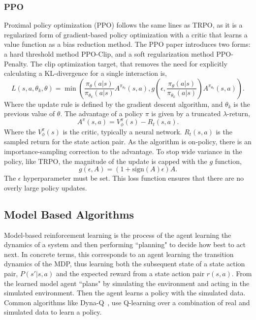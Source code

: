 \subsubsection{PPO}\label{sec:PPO}
Proximal policy optimization (PPO) follows the same lines as TRPO, as it is a regularized form of gradient-based policy optimization with a critic that learns a value function as a bias reduction method. The PPO paper introduces two forms: a hard threshold method PPO-Clip, and a soft regularization method PPO-Penalty. The clip optimization target, that removes the need for explicitly calculating a KL-divergence for a single interaction is,
\begin{equation}
	L(s, a, \theta_k, \theta) = \min \left( \frac{\pi_\theta(a|s)}{\pi_{\theta_k}(a|s)} A^{\pi_{\theta_k}}(s,a), g\left(\epsilon, \frac{\pi_\theta(a|s)}{\pi_{\theta_k}(a|s)} \right)A^{\pi_{\theta_k}}(s, a) \right).
\end{equation}
Where the update rule is defined by the gradient descent algorithm, and $\theta_k$ is the previous value of $\theta$. The advantage of a policy $\pi$ is given by a truncated $\lambda$-return,
\begin{equation}
	A^{\pi}(s, a) = V^\pi _\phi(s) - R_t(s, a).
\end{equation}
Where the $V^\pi _ \phi(s)$ is the critic, typically a neural network. $R_t(s, a)$ is the sampled return for the state action pair. As the algorithm is on-policy, there is an importance-sampling correction to the advantage. To stop wide variance in the policy, like TRPO, the magnitude of the update is capped with the $g$ function,
\begin{equation}
	g(\epsilon, A) = (1 + \text{sign}(A)\epsilon)A.
\end{equation}
The $\epsilon$ hyperparameter must be set. This loss function ensures that there are no overly large policy updates.

\subsection{Model Based Algorithms}
Model-based reinforcement learning is the process of the agent learning the dynamics of a system and then performing ``planning" to decide how best to act next. In concrete terms, this corresponds to an agent learning the transition dynamics of the MDP, thus learning both the subsequent state of a state action pair, $P(s'| s, a)$ and the expected reward from a state action pair $r(s, a)$. From the learned model agent ``plans" by simulating the environment and acting in the simulated environment. Then the agent learns a policy with the simulated data. Common algorithms like Dyna-Q~\cite{sutton2018reinforcement}, use Q-learning over a combination of real and simulated data to learn a policy.

